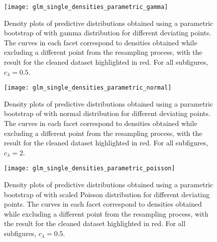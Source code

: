 \documentclass[a4paper]{book}
\begin{document}
\begin{landscape}
  \begin{figure}
    \centering
    \texttt{[image: glm\_single\_densities\_parametric\_gamma]}
    \caption[Single outlier density plots for ODP model, parametric bootstrap with gamma distribution]{Density plots of predictive distributions obtained using a parametric bootstrap of  with gamma distribution for different deviating points. The curves in each facet correspond to densities obtained while excluding a different point from the resampling process, with the result for the cleaned dataset highlighted in red. For all subfigures, $c_\lambda = 0.5$.}
    \label{fig:odp-single-param-gamma}
  \end{figure}
\end{landscape}

\begin{landscape}
  \begin{figure}
    \centering
    \texttt{[image: glm\_single\_densities\_parametric\_normal]}
    \caption[Single outlier density plots for ODP model, parametric bootstrap with normal distribution]{Density plots of predictive distributions obtained using a parametric bootstrap of  with normal distribution for different deviating points. The curves in each facet correspond to densities obtained while excluding a different point from the resampling process, with the result for the cleaned dataset highlighted in red. For all subfigures, $c_\lambda = 2$.}
    \label{fig:odp-single-param-norm}
  \end{figure}
\end{landscape}

\begin{landscape}
  \begin{figure}
    \centering
    \texttt{[image: glm\_single\_densities\_parametric\_poisson]}
    \caption[Single outlier density plots for ODP model, parametric bootstrap with scaled Poisson distribution]{Density plots of predictive distributions obtained using a parametric bootstrap of  with scaled Poisson distribution for different deviating points. The curves in each facet correspond to densities obtained while excluding a different point from the resampling process, with the result for the cleaned dataset highlighted in red. For all subfigures, $c_\lambda = 0.5$.}
    \label{fig:odp-single-param-pois}
  \end{figure}
\end{landscape}
\end{document}
